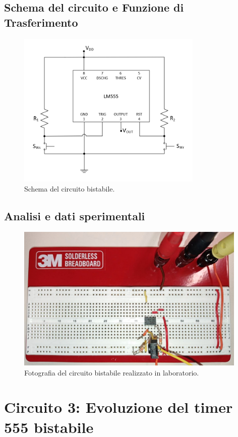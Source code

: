 \documentclass{report}
\begin{document}
\subsection{Schema del circuito e Funzione di Trasferimento}
\begin{figure}[h!]
	\centering
	\includegraphics[height=7.5cm]{immagini/schema2}
	\caption{Schema del circuito bistabile.}
	\label{figura:schema2}
\end{figure}
\subsection{Analisi e dati sperimentali}
\begin{figure}[h!]
	\centering
	\includegraphics[height=7cm]{immagini/circuito2}
	\caption{Fotografia del circuito bistabile realizzato in laboratorio.}
	\label{figura:circuito2}
\end{figure}
\newpage
\section{Circuito 3: Evoluzione del timer 555 bistabile}
\end{document}
